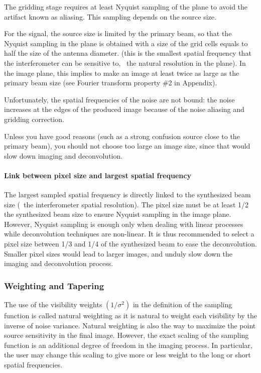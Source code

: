 The gridding stage requires at least Nyquist sampling of the \uv{} 
plane to avoid the artifact known as aliasing. This sampling
depends on the source size. 

For the signal, the source size is limited by the primary beam, so that the 
Nyquist sampling in the \uv{} plane is obtained with a size of the grid 
cells equals to half the size of the antenna diameter. (this is the 
smallest spatial frequency that the interferometer can be sensitive to, 
\ie\ the natural resolution in the \uv{} plane). In the image plane, 
this implies to make an image at least twice as large as the primary 
beam size (see Fourier transform property \#2 in Appendix). 

Unfortunately, the spatial frequencies of the noise are not
bound:  the noise increases at the edges of the produced image 
because of the noise aliasing and gridding correction.

Unless you have good reasons (such as a strong confusion source close
to the primary beam), you should not choose too large an image size,
since that would slow down imaging and deconvolution.

\paragraph{Link between pixel size and largest \uv{} spatial frequency}

The largest sampled spatial frequency is directly linked to the synthesized
beam size (\ie\ the interferometer spatial resolution). The pixel size must
be at least 1/2 the synthesized beam size to ensure Nyquist sampling in the
image plane. However, Nyquist sampling is enough only when dealing with
linear processes while deconvolution techniques are non-linear.  It
is thus recommended to select a pixel size between 1/3 and 1/4 of the synthesized
beam to ease the deconvolution. Smaller pixel sizes would lead
to larger images, and unduly slow down the imaging and deconvolution process.

\subsubsection{Weighting and Tapering}

The use of the visibility weights $(1/\sigma^2)$ in the definition of the
sampling function is called natural weighting as it is natural to weight
each visibility by the inverse of noise variance. Natural weighting is also
the way to maximize the point source sensitivity in the final image.
However, the exact scaling of the sampling function is an additional degree
of freedom in the imaging process. In particular, the user may change this
scaling to give more or less weight to the long or short spatial frequencies.

